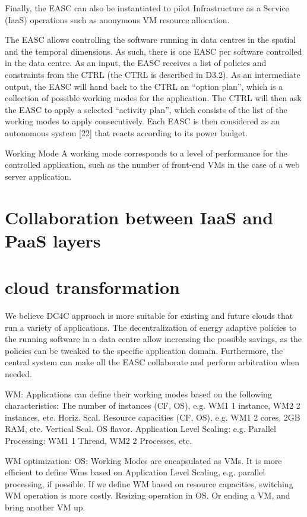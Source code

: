 \documentclass[10pt, conference, compsocconf]{IEEEtran}
\begin{document}
Finally, the EASC can also be instantiated to pilot Infrastructure as a Service (IaaS) operations such as anonymous VM resource allocation.

The EASC allows controlling the software running in data centres in the spatial and the temporal dimensions. As such, there is one EASC per software controlled in the data centre. As an input, the EASC receives a list of policies and constraints from the CTRL (the CTRL is described in D3.2). As an intermediate output, the EASC will hand back to the CTRL an “option plan”, which is a collection of possible working modes for the application. The CTRL will then ask the EASC to apply a selected “activity plan”, which consists of the list of the working modes to apply consecutively. Each EASC is then considered as an autonomous system [22] that reacts according to its power budget.

Working Mode
A working mode corresponds to a level of performance for the controlled application, such as the number of front-end VMs in the case of a web server application.


\section{Collaboration between IaaS and PaaS layers}

\section{cloud transformation}
We believe DC4C approach is more suitable for existing and future clouds that run a variety of applications. The decentralization of energy adaptive policies to the running software in a data centre allow increasing the possible savings, as the policies can be tweaked to the specific application domain. Furthermore, the central system can make all the EASC collaborate and perform arbitration when needed.

WM:
Applications can define their working modes based on the following characteristics:
The number of instances (CF, OS), e.g. WM1 1 instance, WM2 2 instances, etc. Horiz. Scal.
Resource capacities (CF, OS), e.g. WM1 2 cores, 2GB RAM, etc. Vertical Scal. OS flavor.
Application Level Scaling: e.g. Parallel Processing: WM1 1 Thread, WM2 2 Processes, etc.

WM optimization:
OS: Working Modes are encapsulated as VMs.
It is more efficient to define Wms based on Application Level Scaling, e.g. parallel processing, if possible.
If we define WM based on resource capacities,  switching WM operation is more costly.
Resizing operation in OS.
Or ending a VM, and bring another VM up.
\end{document}
